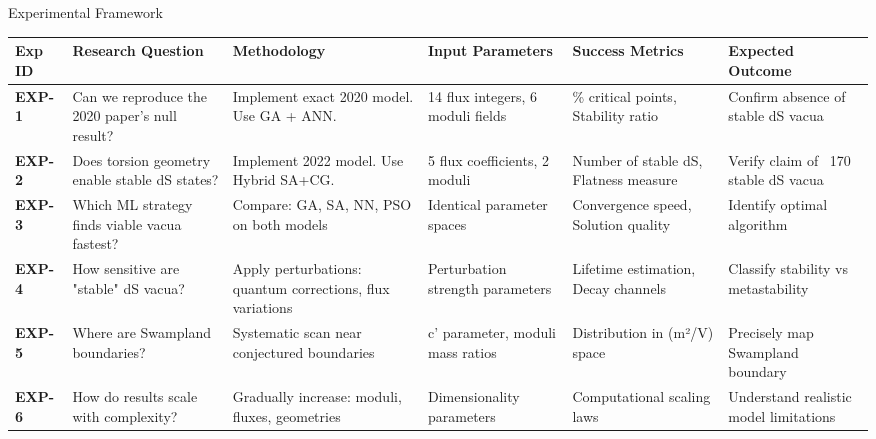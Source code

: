 
\begin{frame}{Experimental Framework}
\footnotesize
\centering
\begin{blur}
    \begin{adjustbox}{max width=\textwidth}
        \begin{tabular}{p{1.2cm}p{2.2cm}p{2.2cm}p{1.8cm}p{2cm}p{2cm}}
            \toprule
            \textbf{Exp ID} & \textbf{Research Question} & \textbf{Methodology} & \textbf{Input Parameters} & \textbf{Success Metrics} & \textbf{Expected Outcome} \\
            \midrule
            \textbf{EXP-1} & Can we reproduce the 2020 paper's null result? & Implement exact 2020 model. Use GA + ANN. & 14 flux integers, 6 moduli fields & \% critical points, Stability ratio & Confirm absence of stable dS vacua \\
            \midrule
            \textbf{EXP-2} & Does torsion geometry enable stable dS states? & Implement 2022 model. Use Hybrid SA+CG. & 5 flux coefficients, 2 moduli & Number of stable dS, Flatness measure & Verify claim of ~170 stable dS vacua \\
            \midrule
            \textbf{EXP-3} & Which ML strategy finds viable vacua fastest? & Compare: GA, SA, NN, PSO on both models & Identical parameter spaces & Convergence speed, Solution quality & Identify optimal algorithm \\
            \midrule
            \textbf{EXP-4} & How sensitive are "stable" dS vacua? & Apply perturbations: quantum corrections, flux variations & Perturbation strength parameters & Lifetime estimation, Decay channels & Classify stability vs metastability \\
            \midrule
            \textbf{EXP-5} & Where are Swampland boundaries? & Systematic scan near conjectured boundaries & c' parameter, moduli mass ratios & Distribution in (m²/V) space & Precisely map Swampland boundary \\
            \midrule
            \textbf{EXP-6} & How do results scale with complexity? & Gradually increase: moduli, fluxes, geometries & Dimensionality parameters & Computational scaling laws & Understand realistic model limitations \\
            \bottomrule
        \end{tabular}
    \end{adjustbox}
\end{blur}
\end{frame}

